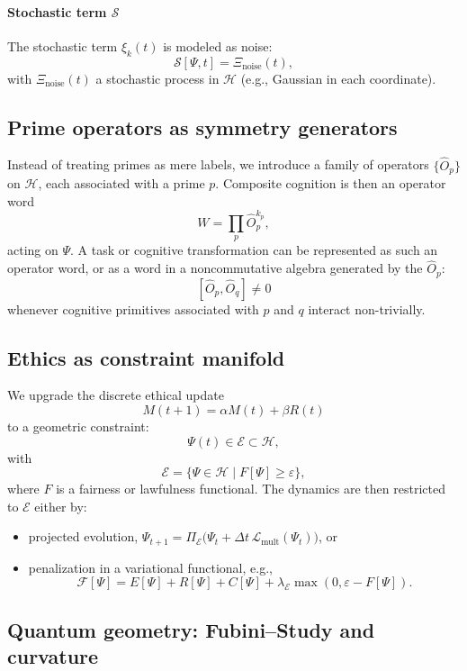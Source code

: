 \documentclass[11pt]{article}
\begin{document}
\paragraph{Stochastic term $\mathcal{S}$}

The stochastic term $\xi_k(t)$ is modeled as noise:
\[
\mathcal{S}[\Psi,t] = \Xi_{\mathrm{noise}}(t),
\]
with $\Xi_{\mathrm{noise}}(t)$ a stochastic process in $\mathcal{H}$ (e.g., Gaussian in each coordinate).

\subsection{Prime operators as symmetry generators}

Instead of treating primes as mere labels, we introduce a family of operators $\{\hat{O}_p\}$ on $\mathcal{H}$, each associated with a prime $p$. Composite cognition is then an operator word
\[
W = \prod_p \hat{O}_p^{k_p},
\]
acting on $\Psi$. A task or cognitive transformation can be represented as such an operator word, or as a word in a noncommutative algebra generated by the $\hat{O}_p$:
\[
[\hat{O}_p,\hat{O}_q]\neq 0
\]
whenever cognitive primitives associated with $p$ and $q$ interact non-trivially.

\subsection{Ethics as constraint manifold}

We upgrade the discrete ethical update
\[
M(t+1) = \alpha M(t) + \beta R(t)
\]
to a geometric constraint:
\begin{equation}
\Psi(t)\in\mathcal{E}\subset\mathcal{H},
\end{equation}
with
\[
\mathcal{E} = \{\Psi\in\mathcal{H} \mid F[\Psi] \geq \varepsilon\},
\]
where $F$ is a fairness or lawfulness functional. The dynamics are then restricted to $\mathcal{E}$ either by:
\begin{itemize}[nosep]
\item projected evolution, $\Psi_{t+1} = \Pi_{\mathcal{E}}\big(\Psi_t + \Delta t\,\mathcal{L}_{\mathrm{mult}}(\Psi_t)\big)$, or
\item penalization in a variational functional, e.g.,
\[
\mathcal{F}[\Psi] = E[\Psi] + R[\Psi] + C[\Psi] + \lambda_{\mathcal{E}}\max(0,\varepsilon - F[\Psi]).
\]
\end{itemize}

\subsection{Quantum geometry: Fubini--Study and curvature}
\end{document}
